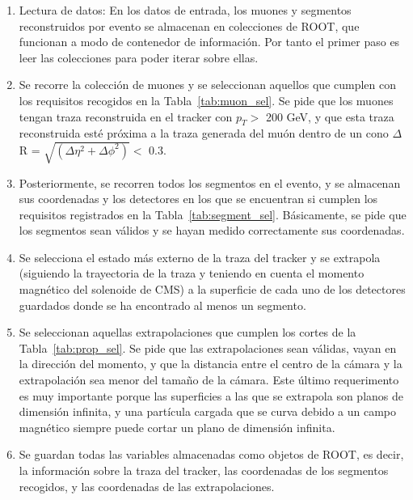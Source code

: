 \begin{enumerate}
\item Lectura de datos: En los datos de entrada, los muones y segmentos reconstruidos por evento se almacenan en colecciones de ROOT, que funcionan a modo de contenedor de informaci\'on. Por tanto el primer paso es leer las colecciones para poder iterar sobre ellas. 
\item Se recorre la colecci\'on de muones y se seleccionan aquellos que cumplen con los requisitos recogidos en la Tabla~\ref{tab:muon_sel}. Se pide que los muones tengan traza reconstruida en el tracker con $p_{T} >$ 200 GeV, y que esta traza reconstruida est\'e pr\'oxima a la traza generada del mu\'on dentro de un cono $\Delta$R = $\sqrt{(\Delta\eta^{2}+\Delta\phi^{2})} <$  0.3.
\item Posteriormente, se recorren todos los segmentos en el evento, y se almacenan sus coordenadas y los detectores en los que se encuentran si cumplen los requisitos registrados en la Tabla~\ref{tab:segment_sel}. B\'asicamente, se pide que los segmentos sean v\'alidos y se hayan medido correctamente sus coordenadas.
\item Se selecciona el estado m\'as externo de la traza del tracker y se extrapola (siguiendo la trayectoria de la traza y teniendo en cuenta el momento magn\'etico del solenoide de CMS) a la superficie de cada uno de los detectores guardados donde se ha encontrado al menos un segmento.
\item Se seleccionan aquellas extrapolaciones que cumplen los cortes de la Tabla~\ref{tab:prop_sel}. Se pide que las extrapolaciones sean v\'alidas, vayan en la direcci\'on del momento, y que la distancia entre el centro de la c\'amara y la extrapolaci\'on sea menor del tamaño de la c\'amara. Este \'ultimo requerimento es muy importante porque las superficies a las que se extrapola son planos de dimensi\'on infinita, y una part\'icula cargada que se curva debido a un campo magn\'etico siempre puede cortar un plano de dimensi\'on infinita.
\item Se guardan todas las variables almacenadas como objetos de ROOT, es decir, la informaci\'on sobre la traza del tracker, las coordenadas de los segmentos recogidos, y las coordenadas de las extrapolaciones.
\end{enumerate}

